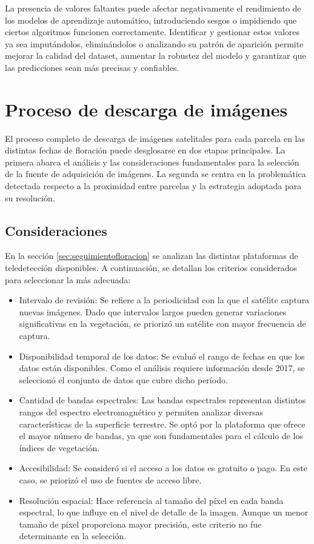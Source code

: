 La presencia de valores faltantes puede afectar negativamente el rendimiento de los modelos
de aprendizaje automático, introduciendo sesgos o impidiendo que ciertos algoritmos funcionen
correctamente. Identificar y gestionar estos valores ya sea imputándolos, eliminándolos o 
analizando su patrón de aparición permite mejorar la calidad del dataset, aumentar la 
robustez del modelo y garantizar que las predicciones sean más precisas y confiables.

\section{Proceso de descarga de imágenes}
El proceso completo de descarga de imágenes satelitales para cada parcela en las distintas fechas de 
floración puede desglosarse en dos etapas principales. La primera abarca el análisis y las consideraciones 
fundamentales para la selección de la fuente de adquisición de imágenes. La segunda se centra en la 
problemática detectada respecto a la proximidad entre parcelas y la estrategia adoptada para su resolución.

\subsection{Consideraciones}
En la sección \ref{sec:seguimientofloracion} se analizan las distintas plataformas de teledetección 
disponibles. A continuación, se detallan los criterios considerados para 
seleccionar la más adecuada:

\begin{itemize}
  \item Intervalo de revisión: Se refiere a la periodicidad con la que el satélite captura
    nuevas imágenes. Dado que intervalos largos pueden generar variaciones significativas 
    en la vegetación, se priorizó un satélite con mayor frecuencia de captura.
  \item Disponibilidad temporal de los datos: Se evaluó el rango de fechas en que los datos
    están disponibles. Como el análisis requiere información desde 2017, se seleccionó el 
    conjunto de datos que cubre dicho período.
  \item Cantidad de bandas espectrales: Las bandas espectrales representan distintos rangos 
    del espectro electromagnético y permiten analizar diversas características de la superficie
    terrestre. Se optó por la plataforma que ofrece el mayor número de bandas, ya que son 
    fundamentales para el cálculo de los índices de vegetación.
  \item Accesibilidad: Se consideró si el acceso a los datos es gratuito o pago. En este caso, 
    se priorizó el uso de fuentes de acceso libre.
  \item Resolución espacial: Hace referencia al tamaño del píxel en cada banda espectral, lo 
    que influye en el nivel de detalle de la imagen. Aunque un menor tamaño de píxel proporciona
     mayor precisión, este criterio no fue determinante en la selección.
\end{itemize}

